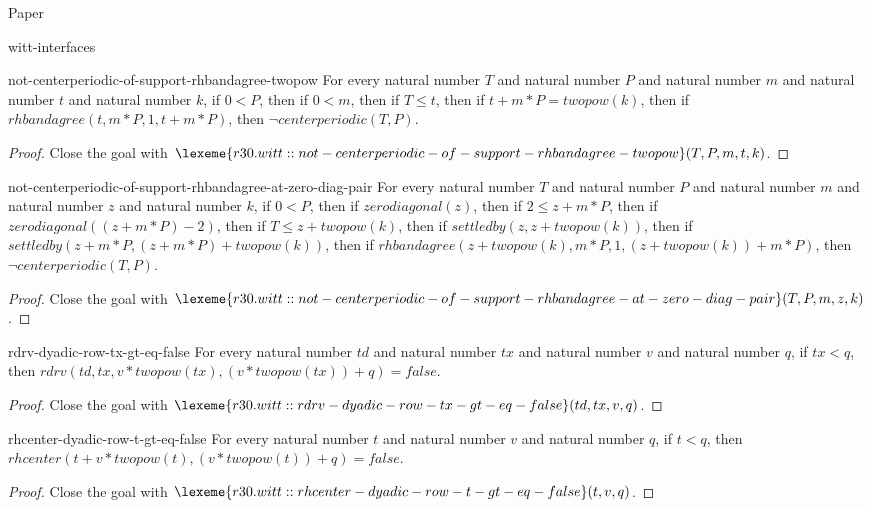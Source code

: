 \begin{lexlean}{Paper}
\begin{section}{witt-interfaces}
  \begin{theorem}{not-centerperiodic-of-support-rhbandagree-twopow}
  For every natural number \(T\) and natural number \(P\) and natural number \(m\) and natural number \(t\) and natural number \(k\), if \(0 < P\), then if \(0 < m\), then if \(T ≤ t\), then if \(t + m * P = twopow(k)\), then if \(rhbandagree(t, m * P, 1, t + m * P)\), then \(¬ centerperiodic(T, P)\).
  \begin{proof}
  Close the goal with \(\lexeme{r30.witt::not-centerperiodic-of-support-rhbandagree-twopow}(T, P, m, t, k)\).
  \end{proof}
  \end{theorem}

  \begin{theorem}{not-centerperiodic-of-support-rhbandagree-at-zero-diag-pair}
  For every natural number \(T\) and natural number \(P\) and natural number \(m\) and natural number \(z\) and natural number \(k\), if \(0 < P\), then if \(zerodiagonal(z)\), then if \(2 ≤ z + m * P\), then if \(zerodiagonal((z + m * P) - 2)\), then if \(T ≤ z + twopow(k)\), then if \(settledby(z, z + twopow(k))\), then if \(settledby(z + m * P, (z + m * P) + twopow(k))\), then if \(rhbandagree(z + twopow(k), m * P, 1, (z + twopow(k)) + m * P)\), then \(¬ centerperiodic(T, P)\).
  \begin{proof}
  Close the goal with \(\lexeme{r30.witt::not-centerperiodic-of-support-rhbandagree-at-zero-diag-pair}(T, P, m, z, k)\).
  \end{proof}
  \end{theorem}

  \begin{theorem}{rdrv-dyadic-row-tx-gt-eq-false}
  For every natural number \(td\) and natural number \(tx\) and natural number \(v\) and natural number \(q\), if \(tx < q\), then \(rdrv(td, tx, v * twopow(tx), (v * twopow(tx)) + q) = false\).
  \begin{proof}
  Close the goal with \(\lexeme{r30.witt::rdrv-dyadic-row-tx-gt-eq-false}(td, tx, v, q)\).
  \end{proof}
  \end{theorem}

  \begin{theorem}{rhcenter-dyadic-row-t-gt-eq-false}
  For every natural number \(t\) and natural number \(v\) and natural number \(q\), if \(t < q\), then \(rhcenter(t + v * twopow(t), (v * twopow(t)) + q) = false\).
  \begin{proof}
  Close the goal with \(\lexeme{r30.witt::rhcenter-dyadic-row-t-gt-eq-false}(t, v, q)\).
  \end{proof}
  \end{theorem}


\end{section}
\end{lexlean}
